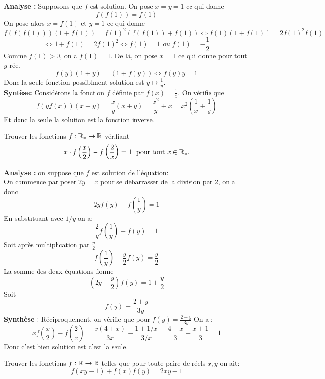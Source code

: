 \begin{preuve}
\textbf{Analyse :} Supposons que $f$ est solution. On pose $x=y=1$ ce qui donne
$$f(f(1))=f(1) $$
On pose alors $x=f(1)$ et $y=1$ ce qui donne
$$f(f(f(1)))(1+f(1))=f(1)^2(f(f(1))+f(1))\iff f(1)(1+f(1))=2f(1)^2f(1)$$ $$\iff 1+f(1)=2f(1)^2\iff f(1)=1 \textit{ ou } f(1)=-\frac{1}{2} $$
Comme $f(1)>0$, on a $f(1)=1$. De là, on pose $x=1$ ce qui donne pour tout $y$ réel
$$f(y)(1+y)=(1+f(y))\iff f(y)y=1 $$
Donc la seule fonction possiblment solution est $y\mapsto \frac{1}{y}$.
\\
\textbf{Syntèse:}
Considérons la fonction $f$ définie par $f(x)=\frac{1}{x}$. On vérifie que $$f(yf(x))(x+y)=\frac{x}{y}(x+y)=\frac{x^2}{y}+x=x^2\left(\frac{1}{x}+ \frac{1}{y}\right) $$
Et donc la seule la solution est la fonction inverse.
\end{preuve}
\begin{exo}[M]
Trouver les fonctions $f:\mathbb R_*\to \mathbb R$ vérifiant
$$x \cdot f\left(\frac{x}{2}\right) - f\left(\frac{2}{x}\right) = 1 \ \text{ pour tout } x \in \mathbb R_*. $$
\end{exo}
\begin{preuve}
\textbf{Analyse :} on suppose que $f$ est solution de l'équation:
\\

On commence par poser $2y=x$ pour se débarrasser de la division par 2, on a donc
$$2yf(y)-f\left(\frac{1}{y}\right)=1$$
En substituant avec $1/y$ on a:
$$\frac{2}{y}f\left(\frac{1}{y}\right)-f(y)=1$$
Soit après multiplication par $\frac{y}{2}$
$$f\left(\frac{1}{y}\right)-\frac{y}{2}f(y)=\frac{y}{2}$$
La somme des deux équations donne
$$\left(2y-\frac{y}{2}\right)f(y)=1+\frac{y}{2}$$
Soit $$f(y)=\frac{2+y}{3y}$$
\textbf{Synthèse :}
Réciproquement, on vérifie que
pour $f(y)=\frac{2+y}{3y}$
On a :
$$xf\left(\frac{x}{2}\right)-f\left(\frac{2}{x}\right)=\frac{x(4+x)}{3x}-\frac{1+1/x}{3/x}=\frac{4+x}{3}-\frac{x+1}{3}=1$$
Donc c'est bien solution est c'est la seule.
\end{preuve}

\begin{exo}[D]
Trouver les fonctions $f:\mathbb R\to \mathbb R$ telles que pour toute paire de réels $x,y$ on ait:
$$f(xy-1)+f(x)f(y)=2xy-1 $$
\end{exo}

